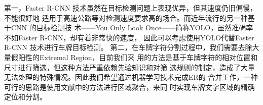 第一，Faster R-CNN 技术虽然在目标检测问题上表现优异，但其速度仍旧偏慢，不能很好地
适用于高速公路等对检测速度要求高的场合。而近年流行的另一种基于CNN 的目标检测技
术——You Only Look Once——简称YOLO，虽然准确率不如Faster R-CNN，却有着非常快的速度，
因此可以考虑使用YOLO代替Faster R-CNN 技术进行车牌目标检测。
第二，在车牌字符分割过程中，我们需要去除大量假阳性的Extremal Region，目前我们采
用的方法是基于车牌字符的相对位置和尺寸进行筛选，但这种方法严重依赖先验知识和对筛
选规则的制定，造成了大量无法处理的特殊情况。因此我们希望通过机器学习技术完成ER的
合并工作，一种可行的思路是使用文献\cite{Gomez:2014vp}中的方法进行区域聚合，来同
时实现车牌文字区域的精确定位和分割。